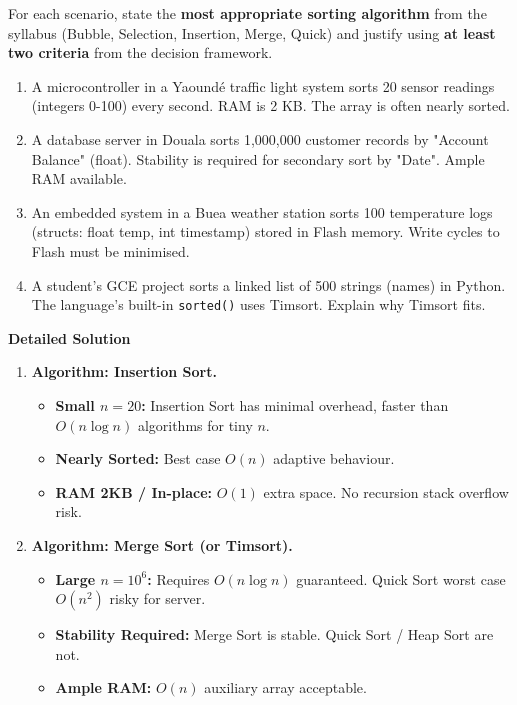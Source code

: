 \documentclass[11pt]{article}
\begin{document}
\begin{exoresolu}
    For each scenario, state the \textbf{most appropriate sorting algorithm} from the syllabus (Bubble, Selection, Insertion, Merge, Quick) and justify using \textbf{at least two criteria} from the decision framework.
    \begin{enumerate}
        \item A microcontroller in a Yaoundé traffic light system sorts 20 sensor readings (integers 0-100) every second. RAM is 2 KB. The array is often nearly sorted.
        \item A database server in Douala sorts 1,000,000 customer records by "Account Balance" (float). Stability is required for secondary sort by "Date". Ample RAM available.
        \item An embedded system in a Buea weather station sorts 100 temperature logs (structs: float temp, int timestamp) stored in Flash memory. Write cycles to Flash must be minimised.
        \item A student's GCE project sorts a linked list of 500 strings (names) in Python. The language's built-in \texttt{sorted()} uses Timsort. Explain why Timsort fits.
    \end{enumerate}
    \tcblower
    \textbf{Detailed Solution}
    \begin{enumerate}
        \item \textbf{Algorithm: Insertion Sort.}
            \begin{itemize}
                \item \textbf{Small $n=20$:} Insertion Sort has minimal overhead, faster than $O(n \log n)$ algorithms for tiny $n$.
                \item \textbf{Nearly Sorted:} Best case $O(n)$ adaptive behaviour.
                \item \textbf{RAM 2KB / In-place:} $O(1)$ extra space. No recursion stack overflow risk.
            \end{itemize}
        \item \textbf{Algorithm: Merge Sort (or Timsort).}
            \begin{itemize}
                \item \textbf{Large $n=10^6$:} Requires $O(n \log n)$ guaranteed. Quick Sort worst case $O(n^2)$ risky for server.
                \item \textbf{Stability Required:} Merge Sort is stable. Quick Sort / Heap Sort are not.
                \item \textbf{Ample RAM:} $O(n)$ auxiliary array acceptable.

\end{itemize}
\end{enumerate}
\end{exoresolu}
\end{document}
